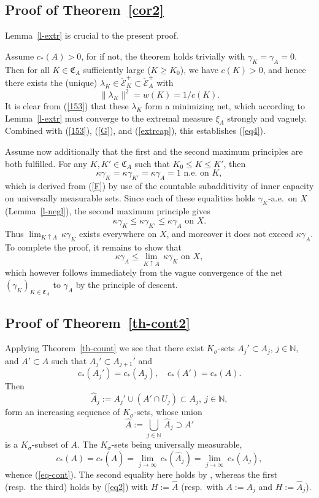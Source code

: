 \documentclass[12pt,a4paper,reqno]{amsart} %
\theoremstyle{lause}
\theoremstyle{maaritelma}
\theoremstyle{lause}
\theoremstyle{maaritelma}
\numberwithin{equation}{section}
\begin{document}
\subsection{Proof of Theorem~\ref{cor2}} Lemma~\ref{l-extr} is crucial to the present proof.

Assume $c_*(A)>0$, for if not, the theorem holds trivially with $\gamma_K=\gamma_A=0$. Then for all $K\in\mathfrak C_A$ sufficiently large ($K\geqslant K_0$), we have $c(K)>0$, and hence there exists the (unique) $\lambda_K\in\breve{\mathcal E}^+_K\subset\breve{\mathcal E}^+_A$ with
\[\|\lambda_K\|^2=w(K)=1/c(K).\]
It is clear from (\ref{153}) that these $\lambda_K$ form a minimizing net,
which according to Lemma~\ref{l-extr} must converge to the extremal measure $\xi_A$ strongly and vaguely. Combined with (\ref{153}), (\ref{G}), and (\ref{extrcap}), this
establishes (\ref{eq4}).

Assume now additionally that the first and the second maximum principles are both fulfilled. For any $K,K'\in\mathfrak C_A$ such that $K_0\leqslant K\leqslant K'$, then
\[\kappa\gamma_K=\kappa\gamma_{K'}=\kappa\gamma_A=1\text{ \ n.e.\ on $K$},\]
which is derived from (\ref{F}) by use of the countable subadditivity of inner capacity on universally measurable sets. Since each of these equalities holds $\gamma_K$-a.e.\ on $X$ (Lemma~\ref{l-negl}), the second maximum principle gives
\[\kappa\gamma_K\leqslant\kappa\gamma_{K'}\leqslant\kappa\gamma_A\text{ \ on $X$}.\]
Thus $\lim_{K\uparrow A}\,\kappa\gamma_K$ exists everywhere on $X$, and moreover it does not exceed $\kappa\gamma_A$. To complete the proof, it remains to show that
\[\kappa\gamma_A\leqslant\lim_{K\uparrow A}\,\kappa\gamma_K\text{ \ on $X$},\]
which however follows immediately from the vague convergence of the net $(\gamma_K)_{K\in\mathfrak C_A}$ to $\gamma_A$ by the principle of descent.

\subsection{Proof of Theorem~\ref{th-cont2}}\label{proof-th-cont2}
Applying Theorem~\ref{th-count} we see that there exist $K_\sigma$-sets $A_j'\subset A_j$, $j\in\mathbb N$, and $A'\subset A$ such that $A_j'\subset A_{j+1}'$ and
\[c_*(A_j')=c_*(A_j),\quad c_*(A')=c_*(A).\]
Then
\[\widehat{A}_j:=A_j'\cup(A'\cap U_j)\subset A_j,\ j\in\mathbb N,\]
form an increasing sequence of $K_\sigma$-sets, whose union
\[\widehat{A}:=\bigcup_{j\in\mathbb N}\,\widehat{A}_j\supset A'\] is a $K_\sigma$-subset of $A$. The $K_\sigma$-sets being universally measurable,
\begin{equation*}\label{eq-cont'}c_*(A)=c_*(\widehat{A})=\lim_{j\to\infty}\,c_*(\widehat{A}_j)=
\lim_{j\to\infty}\,c_*(A_j),\end{equation*}
whence (\ref{eq-cont}). The second equality here holds by \cite[Lemma~2.3.3]{F1}, whereas the first (resp.\ the third) holds by (\ref{eq2}) with $H:=\widehat{A}$ (resp.\ with $A:=A_j$ and $H:=\widehat{A}_j$).
\end{document}
